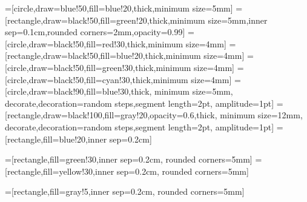 \documentclass[a4paper,10pt]{article}
\begin{document}
=[circle,draw=blue!50,fill=blue!20,thick,minimum
   size=5mm]
=[rectangle,draw=black!50,fill=green!20,thick,minimum
   size=5mm,inner sep=0.1cm,rounded corners=2mm,opacity=0.99]
=[circle,draw=black!50,fill=red!30,thick,minimum
   size=4mm]
=[rectangle,draw=black!50,fill=blue!20,thick,minimum
   size=4mm]
=[circle,draw=black!50,fill=green!30,thick,minimum
   size=4mm]
=[circle,draw=black!50,fill=cyan!30,thick,minimum
   size=4mm]
=[circle,draw=black!90,fill=blue!30,thick,
  minimum size=5mm,
  decorate,decoration={random steps,segment length=2pt,
                                 amplitude=1pt}]
=[rectangle,draw=black!100,fill=gray!20,opacity=0.6,thick,
  minimum size=12mm,
  decorate,decoration={random steps,segment length=2pt,
                                 amplitude=1pt}]
=[rectangle,fill=blue!20,inner sep=0.2cm]


=[rectangle,fill=green!30,inner sep=0.2cm,
                                                rounded corners=5mm]
=[rectangle,fill=yellow!30,inner sep=0.2cm,
                                                rounded corners=5mm]

=[rectangle,fill=gray!5,inner sep=0.2cm,
                                                rounded corners=5mm]
\end{document}
